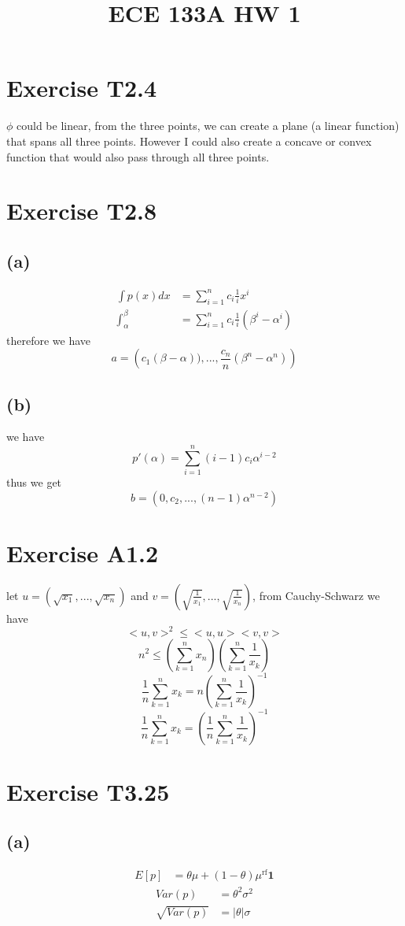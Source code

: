 
\title{ECE 133A HW 1}

\maketitle
\section*{Exercise T2.4}
$\phi$ could be linear, from the three points, we can create a plane (a linear function) that spans all three points. However I could also create a concave or convex function that would also pass through all three points.
\section*{Exercise T2.8}
\subsection*{(a)}
\begin{align*}
\int p(x)dx&=\sum_{i=1}^{n}c_i\frac{1}{i}x^{i}\\
\int_{\alpha}^\beta&=\sum_{i=1}^{n}c_i\frac{1}{i}(\beta^i-\alpha^i)
\end{align*}
therefore we have
$$a=\boxed{\left(c_1(\beta-\alpha)),...,\frac{c_n}{n}(\beta^n-\alpha^n)\right)}$$
\subsection*{(b)}
we have
$$p'(\alpha)=\sum_{i=1}^{n}(i-1)c_i \alpha^{i-2}$$
thus we get
$$b=\boxed{\left(0,c_2,...,(n-1)\alpha^{n-2}\right)}$$
\section*{Exercise A1.2}
let $u=(\sqrt{x_1},...,\sqrt{x_n})$ and $v=\left(\sqrt{\frac{1}{x_1}},...,\sqrt{\frac{1}{x_n}}\right)$, from Cauchy-Schwarz we have
$$<u,v>^2\leq<u,u><v,v>$$
$$n^2\leq\left(\sum_{k=1}^{n}x_n\right)\left(\sum_{k=1}^{n}\frac{1}{x_k}\right)$$
$$\frac{1}{n}\sum_{k=1}^{n}x_k=n\left(\sum_{k=1}^n\frac{1}{x_k}\right)^{-1}$$
$$\frac{1}{n}\sum_{k=1}^{n}x_k=\left(\frac{1}{n}\sum_{k=1}^n\frac{1}{x_k}\right)^{-1}$$
\section*{Exercise T3.25}
\subsection*{(a)}
\begin{align*}
	E[p]&=\boxed{\theta\mu+(1-\theta)\mu^{\text{rf}}\textbf{1}}
\end{align*}
\begin{align*}
	Var(p)&=\theta^2\sigma^2\\
	\sqrt{Var(p)}&=\boxed{|\theta|\sigma}
\end{align*}

